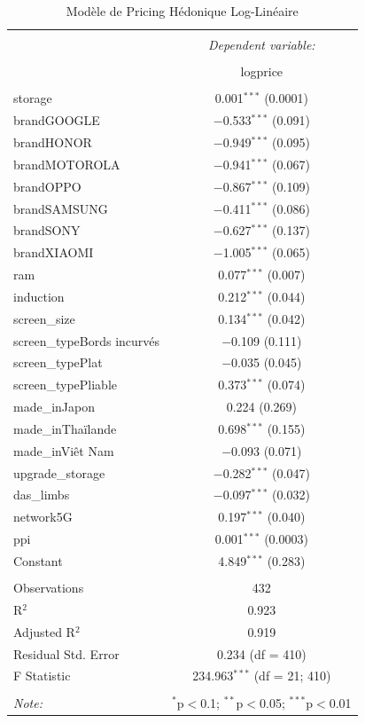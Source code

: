 \documentclass[
  12pt,
]{report}
\begin{document}
\begin{table}[!htbp] \centering 
  \caption{Modèle de Pricing Hédonique Log-Linéaire } 
  \label{} 
\footnotesize 
\begin{tabular}{@{\extracolsep{5pt}}lc} 
\\[-1.8ex]\hline 
\hline \\[-1.8ex] 
 & \multicolumn{1}{c}{\textit{Dependent variable:}} \\ 
\cline{2-2} 
\\[-1.8ex] & logprice \\ 
\hline \\[-1.8ex] 
 storage & 0.001$^{***}$ (0.0001) \\ 
  brandGOOGLE & $-$0.533$^{***}$ (0.091) \\ 
  brandHONOR & $-$0.949$^{***}$ (0.095) \\ 
  brandMOTOROLA & $-$0.941$^{***}$ (0.067) \\ 
  brandOPPO & $-$0.867$^{***}$ (0.109) \\ 
  brandSAMSUNG & $-$0.411$^{***}$ (0.086) \\ 
  brandSONY & $-$0.627$^{***}$ (0.137) \\ 
  brandXIAOMI & $-$1.005$^{***}$ (0.065) \\ 
  ram & 0.077$^{***}$ (0.007) \\ 
  induction & 0.212$^{***}$ (0.044) \\ 
  screen\_size & 0.134$^{***}$ (0.042) \\ 
  screen\_typeBords incurvés & $-$0.109 (0.111) \\ 
  screen\_typePlat & $-$0.035 (0.045) \\ 
  screen\_typePliable & 0.373$^{***}$ (0.074) \\ 
  made\_inJapon & 0.224 (0.269) \\ 
  made\_inThaïlande & 0.698$^{***}$ (0.155) \\ 
  made\_inViêt Nam & $-$0.093 (0.071) \\ 
  upgrade\_storage & $-$0.282$^{***}$ (0.047) \\ 
  das\_limbs & $-$0.097$^{***}$ (0.032) \\ 
  network5G & 0.197$^{***}$ (0.040) \\ 
  ppi & 0.001$^{***}$ (0.0003) \\ 
  Constant & 4.849$^{***}$ (0.283) \\ 
 \hline \\[-1.8ex] 
Observations & 432 \\ 
R$^{2}$ & 0.923 \\ 
Adjusted R$^{2}$ & 0.919 \\ 
Residual Std. Error & 0.234 (df = 410) \\ 
F Statistic & 234.963$^{***}$ (df = 21; 410) \\ 
\hline 
\hline \\[-1.8ex] 
\textit{Note:}  & \multicolumn{1}{r}{$^{*}$p$<$0.1; $^{**}$p$<$0.05; $^{***}$p$<$0.01} \\ 
\end{tabular} 
\end{table}
\end{document}
